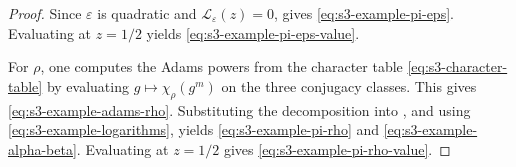 \begin{proof}
  Since \(\varepsilon\) is quadratic and
  \(\mathcal L_\varepsilon(z)=0\), 
  gives \eqref{eq:s3-example-pi-eps}. Evaluating at \(z=1/2\) yields
  \eqref{eq:s3-example-pi-eps-value}.

  For \(\rho\), one computes the Adams powers from the character table
  \eqref{eq:s3-character-table} by evaluating \(g\mapsto \chi_\rho(g^m)\)
  on the three conjugacy classes. This gives
  \eqref{eq:s3-example-adams-rho}. Substituting the decomposition into
  , and using
  \eqref{eq:s3-example-logarithms}, yields
  \eqref{eq:s3-example-pi-rho} and \eqref{eq:s3-example-alpha-beta}.
  Evaluating at \(z=1/2\) gives \eqref{eq:s3-example-pi-rho-value}.
\end{proof}

